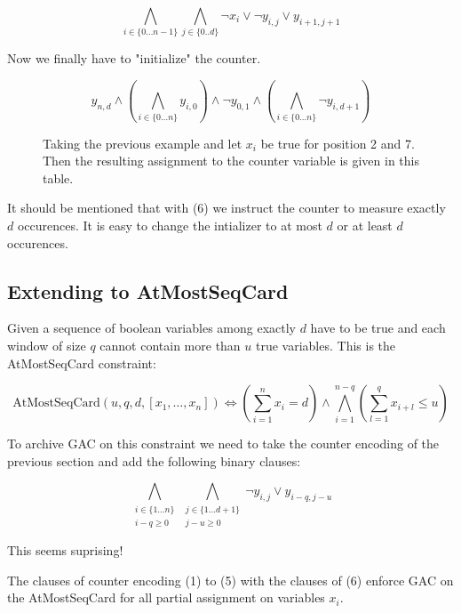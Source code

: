 \documentclass[]{llncs}
\begin{document}
\begin{equation}
    \bigwedge_{i \in \{0\ldots n-1\}} \bigwedge_{j\in\{0..d\}}
    \neg x_{i} \vee \neg y_{i,j} \vee y_{i+1,j+1}
\end{equation}

Now we finally have to "initialize" the counter. 

\begin{equation}
y_{n,d} \wedge \left (\bigwedge_{i\in\{0\ldots n\}} y_{i,0} \right )\wedge \neg
    y_{0,1} \wedge \left(\bigwedge_{i\in\{0\ldots n\}} \neg
        y_{i,d+1}\right )
\end{equation}


\begin{figure}
\centering 
\caption{Taking the previous example and let $x_{i}$ be true for
    position 2 and 7. Then the resulting assignment to the counter
    variable is given in this table. }

\end{figure}

It should be mentioned that with (6) we instruct the counter to measure
exactly $d$ occurences. It is easy to change the intializer to at most
$d$ or at least $d$ occurences. 

\subsection{Extending to AtMostSeqCard}

Given a sequence of boolean variables among exactly $d$ have to be true
and each window of size $q$ cannot contain more than $u$ true variables.
This is the AtMostSeqCard constraint: 

$$ \text{AtMostSeqCard}(u,q,d,[x_{1},\ldots,x_{n}]) \iff (\sum_{i=1}^n
x_{i} = d) \wedge \bigwedge_{i=1}^{n-q}(\sum_{l=1}^q x_{i+l} \leq u )$$

To archive GAC on this constraint we need to take the counter encoding
of the previous section and add the following binary clauses:

\begin{equation}
    \bigwedge_{\substack{i \in \{1 \ldots n\} \\ i-q \geq 0}}
    \bigwedge_{\substack{j\in\{1\ldots d+1\}\\ j-u \geq 0}}
    \neg y_{i,j} \vee y_{i-q,j-u}
\end{equation}               

This seems suprising! 

\begin{theorem}
    The clauses of counter encoding (1) to (5) with the clauses of (6)
    enforce GAC on the AtMostSeqCard for all partial assignment on
    variables $x_{i}$. 
\end{theorem}
\end{document}
